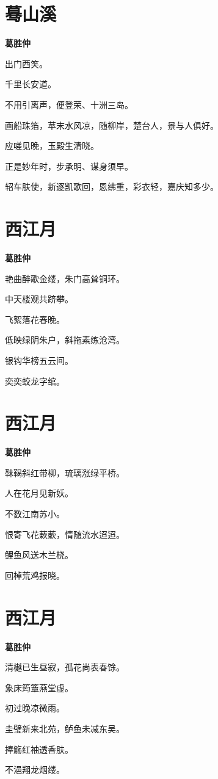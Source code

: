 \documentclass[12pt,a4paper]{ctexbook}
\begin{document}
\section{蓦山溪}
\textbf{葛胜仲}\par\vspace{0.5em}
出门西笑。\par
千里长安道。\par
不用引离声，便登荣、十洲三岛。\par
画船珠箔，苹末水风凉，随柳岸，楚台人，景与人俱好。\par
应嗟见晚，玉殿生清晓。\par
正是妙年时，步承明、谋身须早。\par
轺车肤使，新逐凯歌回，恩绋重，彩衣轻，嘉庆知多少。\par

\section{西江月}
\textbf{葛胜仲}\par\vspace{0.5em}
艳曲醉歌金缕，朱门高耸铜环。\par
中天楼观共跻攀。\par
飞絮落花春晚。\par
低映绿阴朱户，斜拖素练沧湾。\par
银钩华榜五云间。\par
奕奕蛟龙字绾。\par

\section{西江月}
\textbf{葛胜仲}\par\vspace{0.5em}
靺鞨斜红带柳，琉璃涨绿平桥。\par
人在花月见新妖。\par
不数江南苏小。\par
恨寄飞花蔌蔌，情随流水迢迢。\par
鲤鱼风送木兰桡。\par
回棹荒鸡报晓。\par

\section{西江月}
\textbf{葛胜仲}\par\vspace{0.5em}
清樾已生昼寂，孤花尚表春馀。\par
象床筠簟燕堂虚。\par
初过晚凉微雨。\par
圭璧新来北苑，鲈鱼未减东吴。\par
捧觞红袖透香肤。\par
不浥翔龙烟缕。\par
\end{document}
